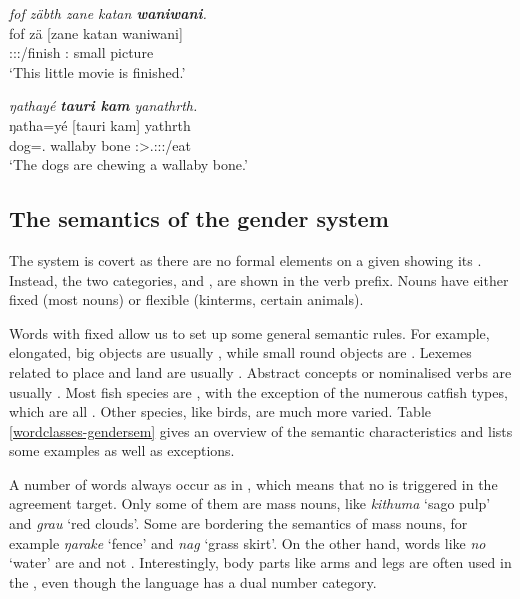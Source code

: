 \begin{exe}
	\ex \emph{fof zäbth zane katan \textbf{waniwani}.}\\
	\gll fof zä [zane katan waniwani]\\
	\Emph{} \Stsg:\Sbj:\Rpst:\Pfv/finish \Dem:\Prox{} small {picture}\\
	\trans `This little movie is finished.' 
	\label{ex046}
\end{exe}
\begin{exe}
	\ex \emph{ŋathayé \textbf{tauri kam} yanathrth.}\\
	\gll ŋatha=yé [tauri kam] yathrth\\
	dog=\Erg.\Nsg{} wallaby bone \Stpl:\Sbj>\Tsg.\Masc:\Obj:\Nonpast:\Ipfv/eat\\
	\trans `The dogs are chewing a wallaby bone.' 
	\label{ex047}
\end{exe}

\subsection{The semantics of the gender system}\label{wordclasses-thegendersystem}

The  system is covert as there are no formal elements on a given  showing its . Instead, the two categories,  and , are shown in the verb prefix. Nouns have either fixed  (most nouns) or flexible  (kinterms, certain animals).%

Words with fixed  allow us to set up some general semantic rules. For example, elongated, big objects are usually , while small round objects are . Lexemes related to place and land are usually . Abstract concepts or nominalised verbs are usually . Most fish species are , with the exception of the numerous catfish types, which are all . Other species, like birds, are much more varied. Table \ref{wordclasses-gendersem} gives an overview of the semantic characteristics and lists some examples as well as exceptions.%

A number of words always occur as in , which means that no  is triggered in the agreement target. Only some of them are mass nouns, like \emph{kithuma} `sago pulp' and \emph{grau} `red clouds'. Some are bordering the semantics of mass nouns, for example \emph{ŋarake} `fence' and \emph{nag} `grass skirt'. On the other hand, words like \emph{no} `water' are  and not . Interestingly, body parts like arms and legs are often used in the , even though the language has a dual number category.%

